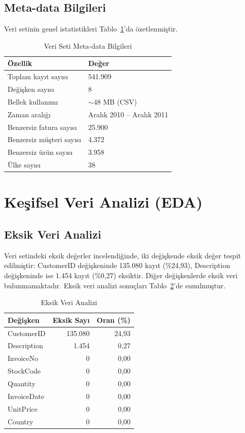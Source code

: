 \documentclass[conference]{IEEEtran}
\begin{document}
\subsection{Meta-data Bilgileri}

Veri setinin genel istatistikleri Tablo~\ref{tab:metadata}'da özetlenmiştir.

\begin{table}[h]
\centering
\caption{Veri Seti Meta-data Bilgileri}
\label{tab:metadata}
\begin{tabular}{ll}
\toprule
\textbf{Özellik} & \textbf{Değer} \\
\midrule
Toplam kayıt sayısı & 541.909 \\
Değişken sayısı & 8 \\
Bellek kullanımı & $\sim$48 MB (CSV) \\
Zaman aralığı & Aralık 2010 -- Aralık 2011 \\
Benzersiz fatura sayısı & 25.900 \\
Benzersiz müşteri sayısı & 4.372 \\
Benzersiz ürün sayısı & 3.958 \\
Ülke sayısı & 38 \\
\bottomrule
\end{tabular}
\end{table}

\section{Keşifsel Veri Analizi (EDA)}

\subsection{Eksik Veri Analizi}

Veri setindeki eksik değerler incelendiğinde, iki değişkende eksik değer tespit edilmiştir: CustomerID değişkeninde 135.080 kayıt (\%24,93), Description değişkeninde ise 1.454 kayıt (\%0,27) eksiktir. Diğer değişkenlerde eksik veri bulunmamaktadır. Eksik veri analizi sonuçları Tablo~\ref{tab:missing}'de sunulmuştur.

\begin{table}[h]
\centering
\caption{Eksik Veri Analizi}
\label{tab:missing}
\begin{tabular}{lrr}
\toprule
\textbf{Değişken} & \textbf{Eksik Sayı} & \textbf{Oran (\%)} \\
\midrule
CustomerID & 135.080 & 24,93 \\
Description & 1.454 & 0,27 \\
InvoiceNo & 0 & 0,00 \\
StockCode & 0 & 0,00 \\
Quantity & 0 & 0,00 \\
InvoiceDate & 0 & 0,00 \\
UnitPrice & 0 & 0,00 \\
Country & 0 & 0,00 \\
\bottomrule
\end{tabular}
\end{table}
\end{document}
